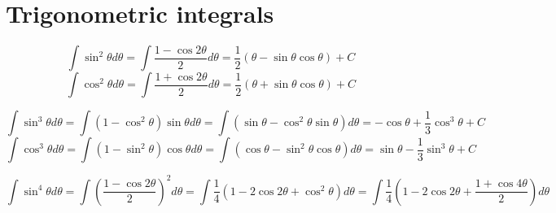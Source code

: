\documentclass{article}
\begin{document}
\section{Trigonometric integrals}

$$\int \sin^2\theta d\theta = \int \frac{1-\cos{2\theta}}{2} d\theta
= \frac{1}{2}(\theta - \sin\theta\cos\theta) + C$$
$$\int \cos^2\theta d\theta = \int \frac{1+\cos{2\theta}}{2} d\theta
= \frac{1}{2}(\theta + \sin\theta\cos\theta) + C$$

$$\int \sin^3\theta d\theta = \int (1-\cos^2\theta)\sin\theta d\theta
= \int (\sin\theta - \cos^2\theta\sin\theta) d\theta
= -\cos\theta + \frac{1}{3}\cos^3\theta + C$$
$$\int \cos^3\theta d\theta = \int (1-\sin^2\theta)\cos\theta d\theta
= \int (\cos\theta - \sin^2\theta\cos\theta) d\theta
= \sin\theta - \frac{1}{3}\sin^3\theta + C$$

$$\int \sin^4\theta d\theta = \int \left(\frac{1-\cos{2\theta}}{2}\right)^2 d\theta
= \int \frac{1}{4}(1 - 2\cos{2\theta} + \cos^2\theta) d\theta
= \int \frac{1}{4}(1 - 2\cos{2\theta} + \frac{1 + \cos{4\theta}}{2}) d\theta$$
\end{document}
